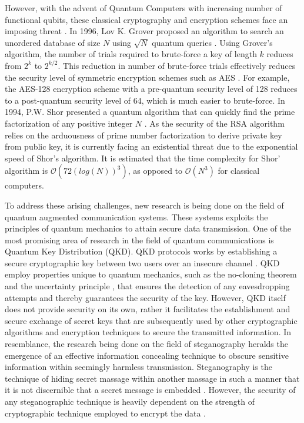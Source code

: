 \documentclass{article}
\begin{document}
However, with the advent of Quantum Computers with increasing number of functional qubits, these classical cryptography and encryption schemes face an imposing threat \cite{bernstein2017post}. In 1996, Lov K. Grover proposed an algorithm to search an unordered database of size $N$ using $\sqrt{N}$ quantum queries \cite{grover1996fast}. Using Grover's algorithm, the number of trials required to brute-force a key of length $k$ reduces from $2^{k}$ to $2^{k/2}$. This reduction in number of brute-force trials effectively reduces the security level of symmetric encryption schemes such as AES \cite{Daemen2002}. For example, the AES-128 encryption scheme with a pre-quantum security level of 128 reduces to a post-quantum security level of 64, which is much easier to brute-force. In 1994, P.W. Shor presented a quantum algorithm that can quickly find the prime factorization of any positive integer $N$ \cite{Shor1997}. As the security of the RSA algorithm relies on the arduousness of prime number factorization to derive private key from public key, it is currently facing an existential threat due to the exponential speed of Shor's algorithm. It is estimated that the time complexity for Shor' algorithm is $\mathcal{O}(72(log(N))^{3})$, as opposed to $\mathcal{O}(N^3)$ for classical computers.

To address these arising challenges, new research is being done on the field of quantum augmented communication systems. These systems exploits the principles of quantum mechanics to attain secure data transmission. One of the most promising area of research in the field of quantum communications is Quantum Key Distribution (QKD). QKD protocols works by establishing a secure cryptographic key between two users over an insecure channel \cite{alleaume2014using}. QKD employ properties unique to quantum mechanics, such as the no-cloning theorem \cite{buvzek1996quantum} and the uncertainty principle \cite{sen2014uncertainty}, that ensures the detection of any eavesdropping attempts and thereby guarantees the security of the key. However, QKD itself does not provide security on its own, rather it facilitates the establishment and secure exchange of secret keys that are subsequently used by other cryptographic algorithms and encryption techniques to secure the transmitted information. In resemblance, the research being done on the field of steganography heralds the emergence of an effective information concealing technique to obscure sensitive information within seemingly harmless transmission. Steganography is the technique of hiding secret massage within another massage in such a manner that it is not discernible that a secret message is embedded \cite{Kahn1996}. However, the security of any steganographic technique is heavily dependent on the strength of cryptographic technique employed to encrypt the data \cite{anderson1998limits}.
\end{document}
